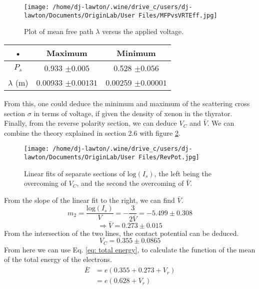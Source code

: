 \documentclass{article}
\begin{document}
\begin{figure}[H]
\begin{center}
\texttt{[image: /home/dj-lawton/.wine/drive\_c/users/dj-lawton/Documents/OriginLab/User Files/MFPvsVRTEff.jpg]}
\caption{\label{fig:MFPvsV} Plot of mean free path $\lambda$ versus the applied voltage.}
\end{center}
\end{figure}
\begin{center}
\begin{tabular}{|c|c|c|}
\hline 
• & Maximum & Minimum \\
\hline 
$P_s$ & 0.933 $\pm 0.005$ & 0.528 $\pm 0.056$ \\ 
\hline 
$\lambda$ (m) & 0.00933 $\pm 0.00131$ & 0.00259 $\pm 0.00001$\\ 
\hline 
\end{tabular} 
\end{center}
From this, one could deduce the minimum and maximum of the scattering cross section $\sigma$ in terms of voltage, if given the density of xenon in the thyrator.\\
\indent Finally, from the reverse polarity section, we can deduce $V_C$ and $\bar{V}$. We can combine the theory explained in section 2.6 with figure \ref{fig:RevPot}.
\begin{figure}[H]
\begin{center}
\texttt{[image: /home/dj-lawton/.wine/drive\_c/users/dj-lawton/Documents/OriginLab/User Files/RevPot.jpg]}
\caption{\label{fig:RevPot} Linear fits of separate sections of $\mathrm{log}(I_s)$, the left being the overcoming of $V_C$, and the second the overcoming of $\bar{V}$.}
\end{center}
\end{figure}
From the slope of the linear fit to the right, we can find $\bar{V}$.
\begin{equation}
m_2=\frac{\mathrm{log}(I_s)}{V}=-\frac{3}{2\bar{V}}=-5.499\pm0.308
\end{equation}
\begin{equation}
\Rightarrow \bar{V}=0.273\pm 0.015
\end{equation}
From the intersection of the two lines, the contact potential can be deduced.
\begin{equation}
V_C=0.355 \pm 0.0865
\end{equation}
From here we can use Eq. \ref{eq: total energy}, to calculate the function of the mean of the total energy of the electrons.
\begin{align}
\bar{E}& =e(0.355+0.273 +V_r)\\
&=e(0.628+V_r)
\end{align}
\end{document}
